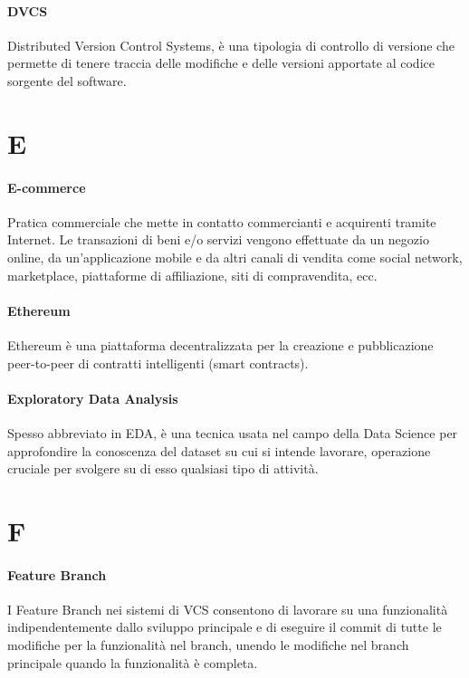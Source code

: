 \documentclass[]{article}
\begin{document}
	\paragraph*{DVCS}
	Distributed Version Control Systems, è una tipologia di controllo di versione che permette di tenere traccia delle modifiche e delle versioni apportate al codice sorgente del software.
	
	\newpage
	
	\section*{E}
	
	\paragraph*{E-commerce}
	Pratica commerciale che mette in contatto commercianti e acquirenti tramite Internet. Le transazioni di beni e/o servizi vengono effettuate da un negozio online, da un'applicazione mobile e da altri canali di vendita come social network, marketplace, piattaforme di affiliazione, siti di compravendita, ecc.
	
	\paragraph*{Ethereum}
	Ethereum è una piattaforma decentralizzata per la creazione e pubblicazione peer-to-peer di contratti intelligenti (smart contracts).
	
	\paragraph*{Exploratory Data Analysis}
	Spesso abbreviato in EDA, è una tecnica usata nel campo della Data Science per approfondire la conoscenza del dataset su cui si intende lavorare, operazione cruciale per svolgere su di esso qualsiasi tipo di attività.
	
	\newpage
	
	\section*{F}
	
	\paragraph*{Feature Branch}
	I Feature Branch nei sistemi di VCS consentono di lavorare su una funzionalità indipendentemente dallo sviluppo principale e di eseguire il commit di tutte le modifiche per la funzionalità nel branch, unendo le modifiche nel branch principale quando la funzionalità è completa.
	
\end{document}
